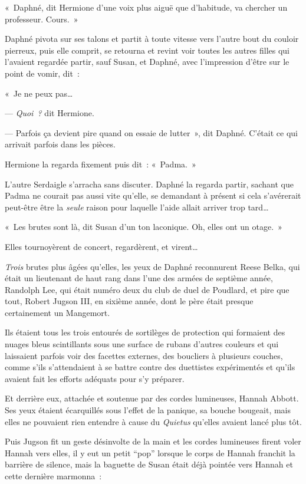 «~Daphné, dit Hermione d'une voix plus aiguë que d'habitude, va chercher un professeur. Cours.~»

Daphné pivota sur ses talons et partit à toute vitesse vers l'autre bout du couloir pierreux, puis elle comprit, se retourna et revint voir toutes les autres filles qui l'avaient regardée partir, sauf Susan, et Daphné, avec l'impression d'être sur le point de vomir, dit~:

«~Je ne peux pas…

--- \emph{Quoi~?} dit Hermione.

--- Parfois ça devient pire quand on essaie de lutter~», dit Daphné. C'était ce qui arrivait parfois dans les pièces.

Hermione la regarda fixement puis dit~: «~Padma.~»

L'autre Serdaigle s'arracha sans discuter. Daphné la regarda partir, sachant que Padma ne courait pas aussi vite qu'elle, se demandant à présent si cela s'avérerait peut-être être la \emph{seule} raison pour laquelle l'aide allait arriver trop tard…

«~Les brutes sont là, dit Susan d'un ton laconique. Oh, elles ont un otage.~»

Elles tournoyèrent de concert, regardèrent, et virent…

\emph{Trois} brutes plus âgées qu'elles, les yeux de Daphné reconnurent Reese Belka, qui était un lieutenant de haut rang dans l'une des armées de septième année, Randolph Lee, qui était numéro deux du club de duel de Poudlard, et pire que tout, Robert Jugson III, en sixième année, dont le père était presque certainement un Mangemort.

Ils étaient tous les trois entourés de sortilèges de protection qui formaient des nuages bleus scintillants sous une surface de rubans d'autres couleurs et qui laissaient parfois voir des facettes externes, des boucliers à plusieurs couches, comme s'ils s'attendaient à se battre contre des duettistes expérimentés et qu'ils avaient fait les efforts adéquats pour s'y préparer.

Et derrière eux, attachée et soutenue par des cordes lumineuses, Hannah Abbott. Ses yeux étaient écarquillés sous l'effet de la panique, sa bouche bougeait, mais elles ne pouvaient rien entendre à cause du \emph{Quietus} qu'elles avaient lancé plus tôt.

Puis Jugson fit un geste désinvolte de la main et les cordes lumineuses firent voler Hannah vers elles, il y eut un petit “pop” lorsque le corps de Hannah franchit la barrière de silence, mais la baguette de Susan était déjà pointée vers Hannah et cette dernière marmonna~:

